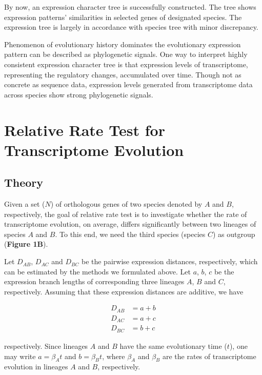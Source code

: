 \documentclass[]{book}
\begin{document}
By now, an expression character tree is successfully constructed. The tree shows expression patterns' similarities in selected genes of designated species. The expression tree is largely in accordance with species tree with minor discrepancy.

Phenomenon of evolutionary history dominates the evolutionary expression pattern can be described as phylogenetic signals. One way to interpret highly consistent expression character tree is that expression levels of transcriptome, representing the regulatory changes, accumulated over time. Though not as concrete as sequence data, expression levels generated from transcriptome data across species show strong phylogenetic signals.

\hypertarget{relative-rate-test-for-transcriptome-evolution}{%
\chapter{Relative Rate Test for Transcriptome Evolution}\label{relative-rate-test-for-transcriptome-evolution}}

\hypertarget{theory-1}{%
\section{Theory}\label{theory-1}}

Given a set (\(N\)) of orthologous genes of two species denoted by \(A\) and \(B\), respectively, the goal of relative rate test is to investigate whether the rate of transcriptome evolution, on average, differs significantly between two lineages of species \(A\) and \(B\). To this end, we need the third species (species \(C\)) as outgroup (\textbf{Figure 1B}).

Let \(D_{AB}\), \(D_{AC}\) and \(D_{BC}\) be the pairwise expression distances, respectively, which can be estimated by the methods we formulated above. Let \(a\), \(b\), \(c\) be the expression branch lengths of corresponding three lineages \(A\), \(B\) and \(C\), respectively. Assuming that these expression distances are additive, we have

\[
\begin{split}
D_{AB}&=a+b \\
D_{AC}&=a+c \\
D_{BC}&=b+c
\end{split}\tag{2.1}
\]

respectively. Since lineages \(A\) and \(B\) have the same evolutionary time (\(t\)), one may write \(a=\beta_At\) and \(b=\beta_Bt\), where \(\beta_A\) and \(\beta_B\) are the rates of transcriptome evolution in lineages \(A\) and \(B\), respectively.
\end{document}
